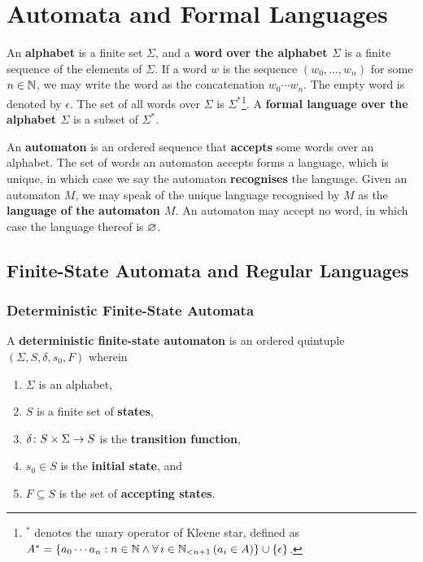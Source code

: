 


\usepackage{tikz}
\usetikzlibrary{automata,decorations.markings}
\newcommand*{\pt}{5mm}
\newcommand*{\lemautorefname}{Lemma}
\newcommand*{\thmautorefname}{Theorem}


\section{Automata and Formal Languages}

An {\bf alphabet} is a finite set \(\Sigma\), and a {\bf word over the alphabet
\(\Sigma\)} is a finite sequence of the elements of \(\Sigma\). If a word \(w\)
is the sequence \((w_0, \ldots, w_n)\) for some \(n \in \setnat\), we may write
the word as the concatenation \(w_0 \cdots w_n\). The empty word is denoted by
\(\epsilon\). The set of all words over \(\Sigma\) is
\(\Sigma^*\)\footnote{\(^*\) denotes the unary operator of Kleene star, defined
as \(A^* = \set{a_0 \cdots a_n : n \in \setnat \land \forall \, i \in \Nln[n +
1] \, (a_i \in A)} \cup \set{\epsilon}\).}. A {\bf formal language over the
alphabet \(\Sigma\)} is a subset of \(\Sigma^*\).

An {\bf automaton} is an ordered sequence that {\bf accepts} some words over an
alphabet. The set of words an automaton accepts forms a language, which is
unique, in which case we say the automaton {\bf recognises} the language. Given
an automaton \(M\), we may speak of the unique language recognised by \(M\) as
the {\bf language of the automaton \(M\)}. An automaton may accept no word, in
which case the language thereof is \(\nset\).

\subsection{Finite-State Automata and Regular Languages}

\subsubsection{Deterministic Finite-State Automata}

\Bdf
    A {\bf deterministic finite-state automaton} is an ordered quintuple
    \((\Sigma, S, \delta, s_0, F)\) wherein
    \begin{enumerate}
        \item \(\Sigma\) is an alphabet,
        \item \(S\) is a finite set of {\bf states},
        \item \(\map{\delta}{S \times \Sigma}{S}\) is the {\bf transition
        function},
        \item \(s_0 \in S\) is the {\bf initial state}, and
        \item \(F \subseteq S\) is the set of {\bf accepting states}.
    \end{enumerate}
\Edf

